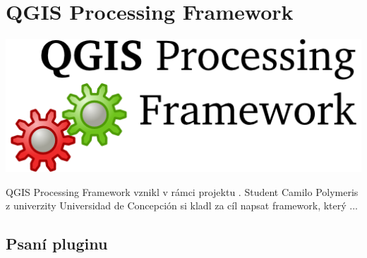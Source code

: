 \newpage
\section{QGIS Processing Framework}

\nocite{pf:www}

\begin{center}
		\includegraphics[scale=0.30]{pictures/qgis_pf}
\end{center}

QGIS Processing Framework vznikl v rámci projektu  . Student Camilo Polymeris z univerzity Universidad de Concepción si kladl za cíl napsat framework, který ... 

\subsection{Psaní pluginu}